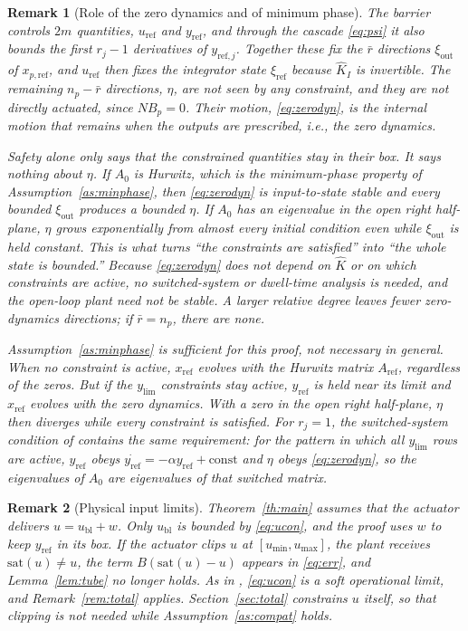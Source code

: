 \documentclass[lettersize,journal]{IEEEtran}
\newtheorem{remark}{Remark}
\newcommand{\Kh}{\hat{K}}
\newcommand{\xr}{x_{\mathrm{ref}}}
\newcommand{\xpr}{x_{p,\mathrm{ref}}}
\newcommand{\Ar}{A_{\mathrm{ref}}}
\newcommand{\ub}{u_{\mathrm{bl}}}
\newcommand{\uref}{u_{\mathrm{ref}}}
\newcommand{\yref}{y_{\mathrm{ref}}}
\newcommand{\ylim}{y_{\mathrm{lim}}}
\begin{document}
\begin{remark}[Role of the zero dynamics and of minimum phase]
The barrier controls $2m$ quantities, $\uref$ and $\yref$, and through the cascade \eqref{eq:psi} it also bounds the first $r_j-1$ derivatives of $y_{\mathrm{ref},j}$. Together these fix the $\bar r$ directions $\xi_{\mathrm{out}}$ of $\xpr$, and $\uref$ then fixes the integrator state $\xi_{\mathrm{ref}}$ because $\Kh_I$ is invertible. The remaining $n_p-\bar r$ directions, $\eta$, are not seen by any constraint, and they are not directly actuated, since $NB_p=0$. Their motion, \eqref{eq:zerodyn}, is the internal motion that remains when the outputs are prescribed, i.e., the zero dynamics.

Safety alone only says that the constrained quantities stay in their box. It says nothing about $\eta$. If $A_0$ is Hurwitz, which is the minimum-phase property of Assumption~\ref{as:minphase}, then \eqref{eq:zerodyn} is input-to-state stable and every bounded $\xi_{\mathrm{out}}$ produces a bounded $\eta$. If $A_0$ has an eigenvalue in the open right half-plane, $\eta$ grows exponentially from almost every initial condition even while $\xi_{\mathrm{out}}$ is held constant. This is what turns ``the constraints are satisfied'' into ``the whole state is bounded.'' Because \eqref{eq:zerodyn} does not depend on $\Kh$ or on which constraints are active, no switched-system or dwell-time analysis is needed, and the open-loop plant need not be stable. A larger relative degree leaves fewer zero-dynamics directions; if $\bar r=n_p$, there are none.

Assumption~\ref{as:minphase} is sufficient for this proof, not necessary in general. When no constraint is active, $\xr$ evolves with the Hurwitz matrix $\Ar$, regardless of the zeros. But if the $\ylim$ constraints stay active, $\yref$ is held near its limit and $\xr$ evolves with the zero dynamics. With a zero in the open right half-plane, $\eta$ then diverges while every constraint is satisfied. For $r_j=1$, the switched-system condition of \cite[Th.~2.3]{lavretsky2025} contains the same requirement: for the pattern in which all $\ylim$ rows are active, $\yref$ obeys $\dot{\yref}=-\alpha\yref+\text{const}$ and $\eta$ obeys \eqref{eq:zerodyn}, so the eigenvalues of $A_0$ are eigenvalues of that switched matrix.
\end{remark}

\begin{remark}[Physical input limits]
Theorem~\ref{th:main} assumes that the actuator delivers $u=\ub+w$. Only $\ub$ is bounded by \eqref{eq:ucon}, and the proof uses $w$ to keep $\yref$ in its box. If the actuator clips $u$ at $[u_{\min},u_{\max}]$, the plant receives $\mathrm{sat}(u)\ne u$, the term $B(\mathrm{sat}(u)-u)$ appears in \eqref{eq:err}, and Lemma~\ref{lem:tube} no longer holds. As in \cite{lavretsky2025}, \eqref{eq:ucon} is a soft operational limit, and Remark~\ref{rem:total} applies. Section~\ref{sec:total} constrains $u$ itself, so that clipping is not needed while Assumption~\ref{as:compat} holds.
\end{remark}
\end{document}
